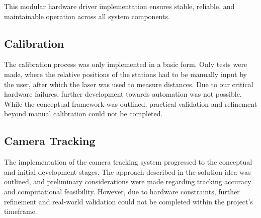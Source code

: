 This modular hardware driver implementation ensures stable, reliable, and maintainable operation across all system components.


\subsection{Calibration}

The calibration process was only implemented in a basic form. Only tests were made, where the relative positions of the stations had to be manually input by the user, after which the laser was used to measure distances. Due to our critical hardware failures, further development towards automation was not possible. While the conceptual framework was outlined, practical validation and refinement beyond manual calibration could not be completed.

\subsection{Camera Tracking}

The implementation of the camera tracking system progressed to the conceptual and initial development stages. The approach described in the solution idea was outlined, and preliminary considerations were made regarding tracking accuracy and computational feasibility. However, due to hardware constraints, further refinement and real-world validation could not be completed within the project's timeframe.

